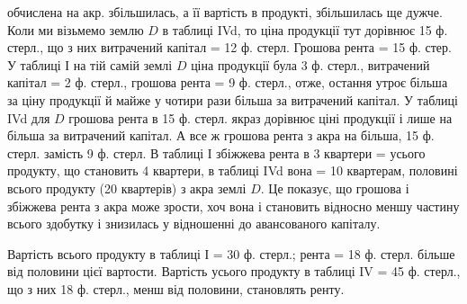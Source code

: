 обчислена на акр. збільшилась, а її вартість в продукті, збільшилась ще дужче.
Коли ми візьмемо землю $D$ в таблиці IVd, то ціна продукції тут дорівнює
15 ф. стерл., що з них витрачений капітал = 12 ф. стерл. Грошова рента = 15
ф. стер. У таблиці І на тій самій землі $D$ ціна продукції була 3 ф. стерл., витрачений
капітал = 2 ф. стерл., грошова рента = 9 ф. стерл., отже, остання
утроє більша за ціну продукції й майже у чотири рази більша за витрачений
капітал. У таблиці IVd для $D$ грошова рента в 15 ф. стерл. якраз дорівнює ціні
продукції і лише на   більша за витрачений капітал. А все ж грошова рента
з акра на   більша, 15 ф. стерл. замість 9 ф. стерл. В таблиці І збіжжева
рента в 3 квартери =   усього продукту, що становить 4 квартери, в таблиці
IVd вона = 10 квартерам, половині всього продукту (20 квартерів) з акра
землі $D$. Це показує, що грошова і збіжжева рента з акра може зрости, хоч
вона і становить відносно меншу частину всього здобутку і знизилась у відношенні
до авансованого капіталу.

Вартість всього продукту в таблиці І = 30 ф. стерл.; рента = 18 ф.
стерл. більше від половини цієї вартости. Вартість усього продукту в таблиці
IV = 45 ф. стерл., що з них 18 ф. стерл., менш від половини, становлять
ренту.

